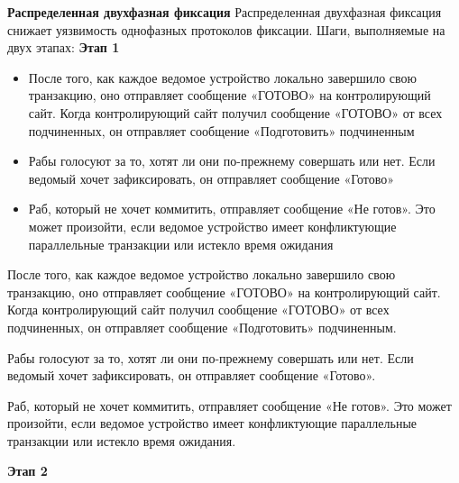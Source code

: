 \bigbreak
\textbf{Распределенная двухфазная фиксация}
Распределенная двухфазная фиксация снижает уязвимость однофазных протоколов фиксации. Шаги, выполняемые на двух этапах:
\bigbreak
\textbf{Этап 1}
\begin{itemize}
    \item После того, как каждое ведомое устройство локально завершило свою транзакцию, оно отправляет сообщение «ГОТОВО» на контролирующий сайт. Когда контролирующий сайт получил сообщение «ГОТОВО» от всех подчиненных, он отправляет сообщение «Подготовить» подчиненным
    \item Рабы голосуют за то, хотят ли они по-прежнему совершать или нет. Если ведомый хочет зафиксировать, он отправляет сообщение «Готово»
    \item Раб, который не хочет коммитить, отправляет сообщение «Не готов». Это может произойти, если ведомое устройство имеет конфликтующие параллельные транзакции или истекло время ожидания
\end{itemize}

После того, как каждое ведомое устройство локально завершило свою транзакцию, оно отправляет сообщение «ГОТОВО» на контролирующий сайт. Когда контролирующий сайт получил сообщение «ГОТОВО» от всех подчиненных, он отправляет сообщение «Подготовить» подчиненным.

Рабы голосуют за то, хотят ли они по-прежнему совершать или нет. Если ведомый хочет зафиксировать, он отправляет сообщение «Готово».

Раб, который не хочет коммитить, отправляет сообщение «Не готов». Это может произойти, если ведомое устройство имеет конфликтующие параллельные транзакции или истекло время ожидания.

\textbf{Этап 2}

